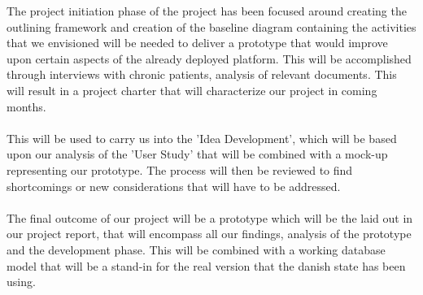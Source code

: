 \documentclass[a4paper,11pt]{article}
\begin{document}
\newpage
The project initiation phase of the project has been focused around creating the outlining framework and creation of the baseline diagram containing the activities that we envisioned will be needed to deliver a prototype that would improve upon certain aspects of the already deployed platform. This will be accomplished through interviews with chronic patients, analysis of relevant documents. This will result in a project charter that will characterize our project in coming months. \\\\
This will be used to carry us into the 'Idea Development', which will be based upon our analysis of the 'User Study' that will be combined with a mock-up representing our prototype. The process will then be reviewed to find shortcomings or new considerations that will have to be addressed.\\\\
The final outcome of our project will be a prototype which will be the laid out in our project report, that will encompass all our findings, analysis of the prototype and the development phase. This will be combined with a working database model that will be a stand-in for the real version that the danish state has been using.
\end{document}
